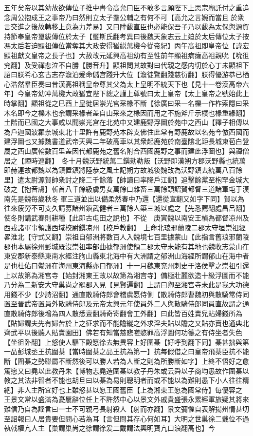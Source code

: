 五年矣帝以其幼故欲傳位子推中書令高允曰臣不敢多言願陛下上思宗廟託付之重追念周公抱成王之事帝乃曰然則立太子羣公輔之有何不可【高允之言婉而當且於衆言交進之後故轉移上意為力差易】又曰陸馛直臣也必能保吾子乃以馛為太保與源賀持節奉皇帝璽紱傳位於太子【璽斯氏翻考異曰後魏天象志云上廹於太后傳位太子按馮太后若迫顯祖傳位當奪其大政安得猶縂萬機今從帝紀】丙午高祖即皇帝位【諱宏顯祖獻文皇帝之長子也】大赦改元延興高祖幼有至性前年顯祖病癕高祖親吮【吮徂兖翻】及受禪悲泣不自勝【勝音升】顯祖問其故對曰代親之感内切於心丁未顯祖下詔曰朕希心玄古志存澹泊爰命儲宫踐升大位【澹徒覽翻踐慈衍翻】朕得優游恭已栖心浩然羣臣奏曰昔漢高祖稱皇帝尊其父為太上皇明不統天下也【見十一卷漢高帝六年】今皇帝幼冲萬機大政猶宜陛下總之謹上尊號曰太上皇帝【太上皇帝之號始此上時掌翻】顯祖從之巳酉上皇徙居崇光宫采椽不斷【徐廣曰采一名櫟一作柞索隱曰采木名即今之櫟木也余謂采椽者盖自山采來之椽因而用之不施斧斤示樸也椽重緣翻】土階而已國之大事咸以聞崇光宫在北苑中又建鹿野浮圖於苑中之西山【釋子相傳以為戶迦國波羅奈城東北十里許有鹿野苑本辟支佛住此常有野鹿故以名苑今倣西國而建浮圖也又據魏書道武帝天興二年破高車以其衆起鹿苑於南臺隂北距長城東苞白登屬之西山廣輪數百里盖因代都鹿苑之舊名附合西國鹿野之事而建此浮圖也】與禪僧居之【禪時連翻】　冬十月魏沃野統萬二鎭勑勒叛【沃野即漢朔方郡沃野縣也統萬即赫連故都魏以為鎮置鎮將陸恭之風土記朔方故城後魏改為沃野鎮去統萬八百餘里】遣太尉源賀帥衆討之降二千餘落【帥讀曰率降戶江翻】追擊餘黨至枹罕金城大破之【抱音膚】斬首八千餘級虜男女萬餘口雜畜三萬餘頭詔賀都督三道諸軍屯于漠南先是魏每歲秋冬軍三道並出以備柔然春中乃還【還從宣翻又如字下同】賀以為往來疲勞不可支久請募諸州鎭武健者三萬餘人築三城以處之【先悉薦翻處昌呂翻】使冬則講武春則耕種【此即古屯田之說也】不從　庚寅魏以南安王楨為都督凉州及西戎諸軍事領護西域校尉鎭凉州【校戶教翻】　上命北琅邪蘭陵二郡太守垣崇祖經畧淮北【守式又翻】崇祖自郁洲將數百人入魏境七百里據蒙山【此指言舊琅邪蘭陵郡也本屬徐州彭城既沒崇祖率部曲據郁洲使領二郡太守未能有其地也魏收志蒙山在東安郡新泰縣東南水經注朐山縣東北海中有大洲謂之郁洲山海經所謂郁山在海中者是也杜佑曰鬱洲在海州東海縣亦曰郁洲】十一月魏東兖州刺史于洛侯擊之崇祖引還　上以故第為湘宫寺【始封湘東王故以故第為湘宫寺】備極壯麗欲造十級浮圖而不能乃分為二新安大守巢尚之罷郡入見【見賢遍翻】上謂曰卿至湘宫寺未此是我大功德用錢不少【少詩沼翻】通直散騎侍郎會稽虞愿侍側【散騎侍郎曹魏初與散騎常侍同置至晉武帝置員外散騎侍郎及元帝太興元年使員外二人與散騎侍郎同員直故謂之通直散騎侍郎後增為四人散悉亶翻騎奇寄翻會工外翻】曰此皆百姓賣兒貼婦錢所為【貼婦謂夫先有婦苦於上之征求而不能贍縱之外求淫夫貼以贍之又貼亦賣也通典北齊武平以後聽人貼賣園田】佛若有知當慈悲嗟愍罪高浮圖何功德之有侍坐者失色【坐徂卧翻】上怒使人驅下殿愿徐去無異容上好圍棊【好呼到翻下同】棊甚拙與第一品彭城丞王抗圍棊【當時圍棊之品王抗為第一】抗每假借之曰皇帝飛棊臣抗不能斷【圍棊之勢聯屬不斷然後可以勝人若為人斷之則為所勝斷如字】上終不悟好之愈篤愿又曰堯以此教丹朱【博物志堯造圍棊以教子丹朱或云舜以子商均愚故作圍棊以教之其法非智者不能也胡旦曰以棊為易則聰明者而或不能以為難則愚下小人往往精絶】非人主所宜好也上雖怒甚以愿王國舊臣【上為湘東王愿為國常侍】每優容之　王景文常以盛滿為憂屢辭位任上不許然中心以景文外戚貴盛張永累經軍旅疑其將來難信乃自為謡言曰一士不可親弓長射殺人【射而亦翻】景文彌懼自表解揚州情甚切至詔報曰人居貴要但問心若為耳【言但問其存心何如耳】大明之世巢徐二戴位不過執戟權亢人主【巢謂巢尚之徐謂徐爰二戴謂法興明寶亢口浪翻高也】今
